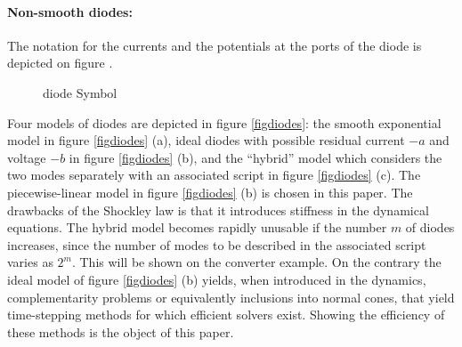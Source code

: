 \documentclass{article}
\begin{document}
\paragraph{Non-smooth  diodes:}  The notation for the currents and the potentials at the ports of
the diode is depicted on figure \cite{fig:DIODE}.

\begin{figure}
  \centering
  
  \caption{diode Symbol}
  \label{fig:DIODE}
\end{figure}


Four models of diodes are depicted in figure \ref{figdiodes}: the smooth exponential model in figure \ref{figdiodes} (a), ideal diodes with possible residual current $-a$ and voltage $-b$ in figure \ref{figdiodes} (b), and the ``hybrid'' model which considers the two modes separately with an associated script in figure \ref{figdiodes} (c). The piecewise-linear model in figure  \ref{figdiodes} (b) is chosen in this paper. The drawbacks of the Shockley law is that it introduces stiffness in the dynamical equations. The hybrid model becomes rapidly unusable if the number $m$ of diodes increases, since the number of modes to be described in the associated script varies as $2^{m}$. This will be shown on the converter example. On the contrary the ideal model of figure  \ref{figdiodes} (b) yields, when introduced in the dynamics, complementarity problems or equivalently inclusions into normal cones, that yield time-stepping methods for which efficient solvers exist. Showing the efficiency of these methods is the object of this paper.
\end{document}
